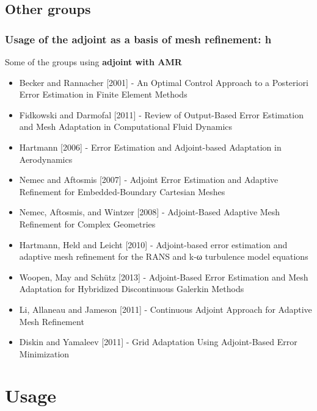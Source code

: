 \documentclass{beamer}
\begin{document}
\subsection{Other groups}
\begin{frame}%
\frametitle{\scriptsize{Usage of the adjoint as a basis of mesh  refinement: h}}
\scriptsize
Some of the groups using \textbf{adjoint with AMR}
\begin{itemize}
\item Becker and Rannacher [2001] - An Optimal Control Approach to a Posteriori Error Estimation in Finite Element Methods
\item Fidkowski and Darmofal [2011] - Review of Output-Based Error Estimation and Mesh Adaptation in Computational Fluid Dynamics
\item Hartmann [2006] - Error Estimation and Adjoint-based Adaptation in Aerodynamics
\item Nemec and Aftosmis [2007] - Adjoint Error Estimation and Adaptive Refinement for Embedded-Boundary Cartesian Meshes
\item Nemec, Aftosmis, and Wintzer [2008] - Adjoint-Based Adaptive Mesh Refinement for Complex Geometries
\item Hartmann, Held and Leicht [2010] - Adjoint-based error estimation and adaptive mesh refinement for the RANS and k-ω turbulence model equations
\item Woopen, May and Sch{\"u}tz [2013] - Adjoint-Based Error Estimation and Mesh Adaptation for Hybridized Discontinuous Galerkin Methods
\item Li, Allaneau and Jameson [2011] - Continuous Adjoint Approach for Adaptive Mesh Refinement
\item Diskin and Yamaleev [2011] - Grid Adaptation Using Adjoint-Based Error Minimization
\end{itemize}
\end{frame}




\section[Usage]{Usage}
\end{document}
